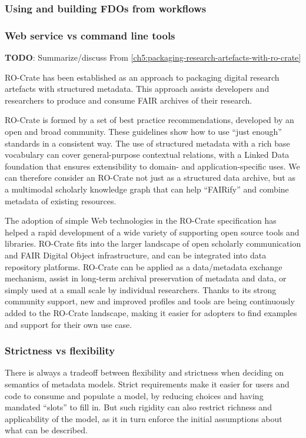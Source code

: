 \subsubsection{Using and building FDOs from workflows}


\subsubsection{Web service vs command line tools}


\textbf{TODO}: Summarize/discuss 
From \vref{ch5:packaging-research-artefacts-with-ro-crate}

RO-Crate has been established as an approach to packaging digital
research artefacts with structured metadata. This approach assists
developers and researchers to produce and consume FAIR archives of their
research.

RO-Crate is formed by a set of best practice recommendations, developed
by an open and broad community. These guidelines show how to use ``just
enough'' standards in a consistent way. The use of structured metadata
with a rich base vocabulary can cover general-purpose contextual
relations, with a Linked Data foundation that ensures extensibility to
domain- and application-specific uses. We can therefore consider an
RO-Crate not just as a structured data archive, but as a multimodal
scholarly knowledge graph that can help ``FAIRify'' and combine metadata
of existing resources.

The adoption of simple Web technologies in the RO-Crate specification
has helped a rapid development of a wide variety of supporting open
source tools and libraries. RO-Crate fits into the larger landscape of
open scholarly communication and FAIR Digital Object infrastructure, and
can be integrated into data repository platforms. RO-Crate can be
applied as a data/metadata exchange mechanism, assist in long-term
archival preservation of metadata and data, or simply used at a small
scale by individual researchers. Thanks to its strong community support,
new and improved profiles and tools are being continuously added to the
RO-Crate landscape, making it easier for adopters to find examples and
support for their own use case.

\subsubsection{Strictness vs flexibility}

There is always a tradeoff between flexibility and strictness \cite{ch5-116}
when deciding on semantics of metadata models. Strict requirements make
it easier for users and code to consume and populate a model, by
reducing choices and having mandated ``slots'' to fill in. But such
rigidity can also restrict richness and applicability of the model, as
it in turn enforce the initial assumptions about what can be described.

